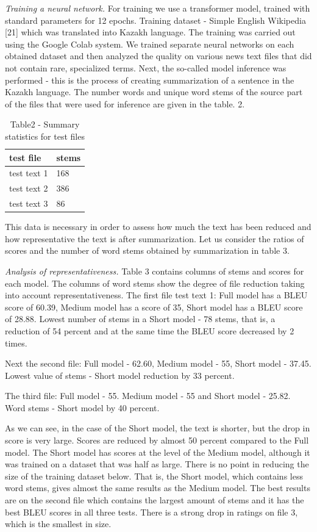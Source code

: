 \begin{multicols}{2}
\emph{Training a neural network.} For training we use a transformer
model, trained with standard parameters for 12 epochs. Training dataset
- Simple English Wikipedia {[}21{]} which was translated into Kazakh
language. The training was carried out using the Google Colab system. We
trained separate neural networks on each obtained dataset and then
analyzed the quality on various news text files that did not contain
rare, specialized terms. Next, the so-called model inference was
performed - this is the process of creating summarization of a sentence
in the Kazakh language. The number words and unique word stems of the
source part of the files that were used for inference are given in the
table. 2.

\begin{table}[H]
\caption*{Table2 - Summary statistics for test files}
\centering
\begin{tabular}{|l|l|}
\hline
test file & stems \\ \hline
test text 1 & 168 \\ \hline
test text 2 & 386 \\ \hline
test text 3 & 86 \\ \hline
\end{tabular}
\end{table}
This data is necessary in order to assess how much the text has been
reduced and how representative the text is after summarization. Let us
consider the ratios of scores and the number of word stems obtained by
summarization in table 3.

\emph{Analysis of representativeness.} Table 3 contains columns of stems
and scores for each model. The columns of word stems show the degree of
file reduction taking into account representativeness. The first file
test text 1: Full model has a BLEU score of 60.39, Medium model has a
score of 35, Short model has a BLEU score of 28.88. Lowest number of
stems in a Short model - 78 stems, that is, a reduction of 54 percent
and at the same time the BLEU score decreased by 2 times.

Next the second file: Full model - 62.60, Medium model - 55, Short model
- 37.45. Lowest value of stems - Short model reduction by 33 percent.

The third file: Full model - 55. Medium model - 55 and Short model -
25.82. Word stems - Short model by 40 percent.

As we can see, in the case of the Short model, the text is shorter, but
the drop in score is very large. Scores are reduced by almost 50 percent
compared to the Full model. The Short model has scores at the level of
the Medium model, although it was trained on a dataset that was half as
large. There is no point in reducing the size of the training dataset
below. That is, the Short model, which contains less word stems, gives
almost the same results as the Medium model. The best results are on the
second file which contains the largest amount of stems and it has the
best BLEU scores in all three tests. There is a strong drop in ratings
on file 3, which is the smallest in size.
\end{multicols}


